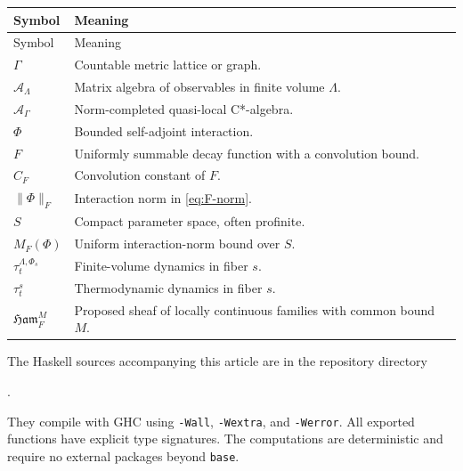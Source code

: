 \documentclass[12pt]{article}
\theoremstyle{definition}
\theoremstyle{remark}
\newcommand{\Alg}{\mathcal A}
\newcommand{\Ham}{\mathfrak{Ham}}
\begin{document}
\begin{longtable}{>{\raggedright\arraybackslash}p{}
                  >{\raggedright\arraybackslash}p{}}
\toprule
Symbol & Meaning \\
\midrule
\endfirsthead
\toprule
Symbol & Meaning \\
\midrule
\endhead
$\Gamma$ & Countable metric lattice or graph. \\
$\Alg_\Lambda$ & Matrix algebra of observables in finite volume $\Lambda$. \\
$\Alg_\Gamma$ & Norm-completed quasi-local C*-algebra. \\
$\Phi$ & Bounded self-adjoint interaction. \\
$F$ & Uniformly summable decay function with a convolution bound. \\
$C_F$ & Convolution constant of $F$. \\
$\|\Phi\|_F$ & Interaction norm in \cref{eq:F-norm}. \\
$S$ & Compact parameter space, often profinite. \\
$M_F(\Phi)$ & Uniform interaction-norm bound over $S$. \\
$\tau_t^{\Lambda,\Phi_s}$ & Finite-volume dynamics in fiber $s$. \\
$\tau_t^s$ & Thermodynamic dynamics in fiber $s$. \\
$\Ham_F^M$ & Proposed sheaf of locally continuous families with common bound $M$. \\
\bottomrule
\end{longtable}

The Haskell sources accompanying this article are in the repository directory

\begin{center}
.
\end{center}

They compile with GHC using
\texttt{-Wall}, \texttt{-Wextra}, and \texttt{-Werror}.  All exported functions have explicit type
signatures.  The computations are deterministic and require no external
packages beyond \texttt{base}.
\end{document}
